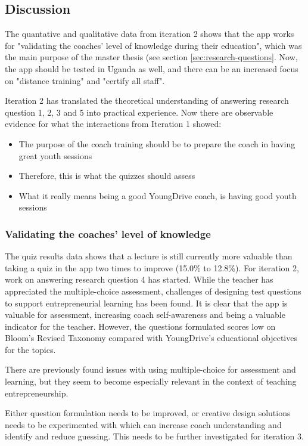 \subsection{Discussion}

The quantative and qualitative data from iteration 2 shows that the app works for "validating the coaches' level of knowledge during their education", which was the main purpose of the master thesis (see section \ref{sec:research-questions}. Now, the app should be tested in Uganda as well, and there can be an increased focus on "distance training" and "certify all staff".

Iteration 2 has translated the theoretical understanding of answering research question 1, 2, 3 and 5 into practical experience. Now there are observable evidence for what the interactions from Iteration 1 showed:

\begin{itemize}
\item The purpose of the coach training should be to prepare the coach in having great youth sessions
\item Therefore, this is what the quizzes should assess
\item What it really means being a good YoungDrive coach, is having good youth sessions
\end{itemize}

\subsubsection{Validating the coaches' level of knowledge}
The quiz results data shows that a lecture is still currently more valuable than taking a quiz in the app two times to improve (15.0\% to 12.8\%). For iteration 2, work on answering research question 4 has started. While the teacher has appreciated the multiple-choice assessment, challenges of designing test questions to support entrepreneurial learning has been found. It is clear that the app is valuable for assessment, increasing coach self-awareness and being a valuable indicator for the teacher. However, the questions formulated scores low on Bloom's Revised Taxonomy \citep{krathwohl} compared with YoungDrive's educational objectives for the topics.

There are previously found issues with using multiple-choice for assessment and learning, but they seem to become especially relevant in the context of teaching entrepreneurship.

Either question formulation needs to be improved, or creative design solutions needs to be experimented with which can increase coach understanding and identify and reduce guessing. This needs to be further investigated for iteration 3.

